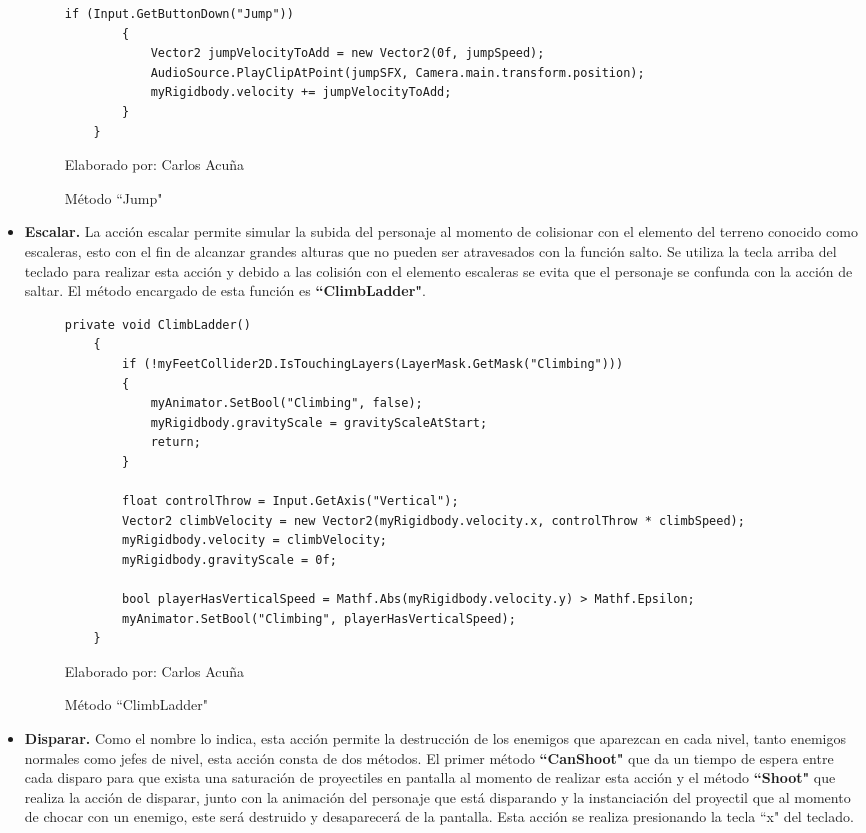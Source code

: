 \documentclass[a4paper, openright, 12pt]{report}
\begin{document}
\begin{itemize}
\begin{figure}[h]
\begin{lstlisting}[frame=single]
        if (Input.GetButtonDown("Jump"))
        {
            Vector2 jumpVelocityToAdd = new Vector2(0f, jumpSpeed);
            AudioSource.PlayClipAtPoint(jumpSFX, Camera.main.transform.position);
            myRigidbody.velocity += jumpVelocityToAdd;
        }
    }
\end{lstlisting}
\caption{Método ``Jump"}
Elaborado por: Carlos Acuña
\end{figure}

\item \textbf{Escalar.} La acción escalar permite simular la subida del personaje   al momento de colisionar con el elemento del terreno conocido como escaleras, esto con el fin de alcanzar grandes alturas que no pueden ser atravesados con la función salto. Se utiliza la tecla arriba del teclado para realizar esta acción y debido a las colisión con el elemento escaleras se evita que el personaje se confunda con la acción de saltar. El método encargado de esta función es \textbf{``ClimbLadder"}.

\begin{figure}[h]
\captionsetup{justification=centering,margin=2cm}
\centering
\lstset{language=C, breaklines=true, basicstyle=\footnotesize}
\lstset{numbers=left, numberstyle=\tiny, stepnumber=1, numbersep=-2pt}
\begin{lstlisting}[frame=single]
  private void ClimbLadder()
    {
        if (!myFeetCollider2D.IsTouchingLayers(LayerMask.GetMask("Climbing")))
        {
            myAnimator.SetBool("Climbing", false);
            myRigidbody.gravityScale = gravityScaleAtStart;
            return;
        }

        float controlThrow = Input.GetAxis("Vertical");
        Vector2 climbVelocity = new Vector2(myRigidbody.velocity.x, controlThrow * climbSpeed);
        myRigidbody.velocity = climbVelocity;
        myRigidbody.gravityScale = 0f;

        bool playerHasVerticalSpeed = Mathf.Abs(myRigidbody.velocity.y) > Mathf.Epsilon;
        myAnimator.SetBool("Climbing", playerHasVerticalSpeed);
    }
\end{lstlisting}
\caption{Método ``ClimbLadder"}
Elaborado por: Carlos Acuña
\end{figure}
\clearpage
\item \textbf{Disparar.} Como el nombre lo indica, esta acción permite la destrucción de los enemigos que aparezcan en cada nivel, tanto enemigos normales como jefes de nivel, esta acción consta de dos métodos. El primer método \textbf{``CanShoot"} que da un tiempo de espera entre cada disparo para que exista una saturación de proyectiles en pantalla al momento de realizar esta acción y el método \textbf{``Shoot"} que realiza la acción de disparar, junto con la animación del personaje que está disparando y la instanciación del proyectil que al momento de chocar con un enemigo, este será destruido y desaparecerá de la pantalla. Esta acción se realiza presionando la tecla ``x" del teclado.


\end{itemize}
\end{document}
